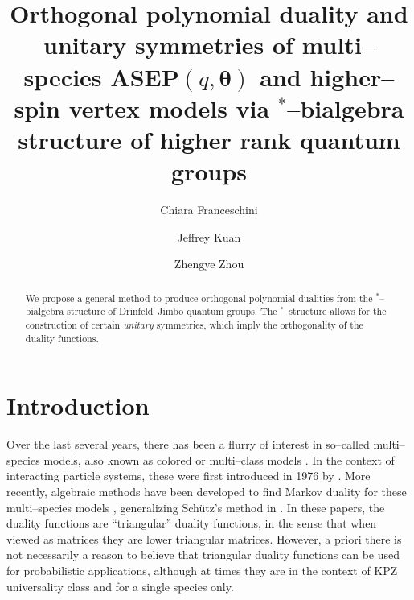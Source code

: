 \documentclass{ximera}
\title{Orthogonal polynomial duality and unitary symmetries of multi--species ASEP$(q,\boldsymbol{\theta})$ and higher--spin vertex models via $^*$--bialgebra structure of higher rank quantum groups}
\author{Chiara Franceschini \and Jeffrey Kuan \and Zhengye Zhou}
\date{}
\begin{document}
\begin{abstract}
We propose a general method to produce orthogonal polynomial dualities from the $^*$--bialgebra structure of Drinfeld--Jimbo quantum groups. The $^*$--structure allows for the construction of certain \textit{unitary} symmetries, which imply the orthogonality of the duality functions.
\end{abstract}

\maketitle





\section{Introduction}
Over the last several years, there has been a flurry of interest in so--called multi--species models, also known as colored or multi--class models \cite{BS,BS2,BS3,BGW,Gal,Kuan-IMRN,KuanCMP,KMMO,Take15,ZZ}. In the context of interacting particle systems, these were first introduced in 1976 by \cite{Ligg76}. More recently, algebraic methods have been developed to find Markov duality for these multi--species models \cite{BS,BS2,BS3,Kuan-IMRN,KuanCMP}, generalizing Sch\"{u}tz's method in \cite{Sch97}. In these papers, the duality functions are ``triangular'' duality functions, in the sense that when viewed as matrices they are lower triangular matrices. However, a priori there is not necessarily a reason to believe that triangular duality functions can be used for probabilistic applications, although at times they are \cite{CST,YLKPZ} in the context of KPZ universality class and for a single species only.
\end{document}
